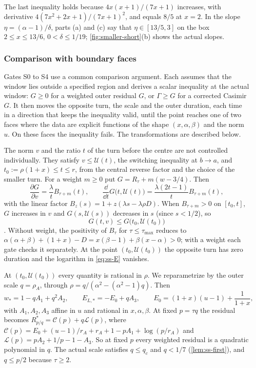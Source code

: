 The last inequality holds because $4x(x+1)/(7x+1)$ increases, with derivative
$4(7x^2+2x+1)/(7x+1)^2$, and equals $8/5$ at $x=2$. In the slope $\eta=(\alpha-1)/\delta$, parts
(a) and (c) say that $\eta\in[13/5,3]$ on the box $2\le x\le13/6$, $0<\delta\le1/19$;
\cref{fig:smaller-short}(b) shows the actual slopes.

\subsubsection{Comparison with boundary faces}\label{sec:ss-machinery}

Gates S0 to S4 use a common comparison argument. Each assumes that the window lies outside a
specified region and derives a scalar inequality at the actual window: $G\ge0$ for a weighted
outer residual $G$, or $\Gamma\ge G$ for a corrected Casimir $G$. It then moves the opposite turn,
the scale and the outer duration, each time in a direction that keeps the inequality valid, until
the point reaches one of two faces where the data are explicit functions of the shape $(x,\alpha,
\beta)$ and the norm $u$. On these faces the inequality fails. The transformations are described
below.

 The norm $v$ and the ratio $t$ of the turn before the centre are not
controlled individually. They satisfy $v\le\mathcal U(t)$, the switching inequality at $b\to a$,
and $t_0:=\rho(1+x)\le t\le r$, from the central reverse factor and the choice of the smaller
turn. For a weight $m\ge0$ put $G=R_\tau+m(w-3/4)$. Then
\[
  \frac{\partial G}{\partial v}=\frac{\lambda}{t}B_{\tau+m}(t),\qquad
  \frac{\dd}{\dd t}G\bigl(t,\mathcal U(t)\bigr)=\frac{\lambda(2t-1)}{t}B_{\tau+m}(t),
\]
with the linear factor $B_z(s)=1+z(\lambda s-\lambda\rho D)$. When $B_{\tau+m}>0$ on $[t_0,t]$,
$G$ increases in $v$ and $G(s,\mathcal U(s))$ decreases in $s$ (since $s<1/2$), so
\begin{equation}\label{eq:ss-envelope}
  G(t,v)\le G\bigl(t_0,\mathcal U(t_0)\bigr)
\end{equation}. Without weight, the positivity of $B_\tau$ for
$\tau\le\tau_{\max}$ reduces to
$\alpha(\alpha+\beta)+(1+x)-D=x(\beta-1)+\beta(x-\alpha)>0$; with a weight each gate checks it separately. At the point
$(t_0,\mathcal U(t_0))$ the opposite turn has zero duration and the logarithm in \eqref{eq:ss-E}
vanishes.

 At $(t_0,\mathcal U(t_0))$ every quantity is rational in $\rho$. We
reparametrize by the outer scale $q=\rho_A$, through $\rho=q/(\alpha^2-(\alpha^2-1)q)$. Then
\begin{equation}\label{eq:ss-scale}
  w_*=1-qA_1+q^2A_2,\qquad E_{L,*}=-E_0+qA_3,\qquad
  E_0=(1+x)(u-1)+\frac{1}{1+x},
\end{equation}
with $A_1,A_2,A_3$ affine in $u$ and rational in $x,\alpha,\beta$. At fixed
$p=\tau q$ the residual becomes $R^*_{p/q}=\mathcal C(p)+q\mathcal L(p)$, where
$\mathcal C(p)=E_0+(u-1)/r_A+r_A+1-pA_1+\log(p/r_A)$ and $\mathcal L(p)=pA_2+1/p-1-A_3$. So at
fixed $p$ every weighted residual is a quadratic polynomial in $q$. The actual scale satisfies
$q\le q_c$ and $q<1/7$ (\cref{lem:ss-first}), and $q\le p/2$ because $\tau\ge2$.

